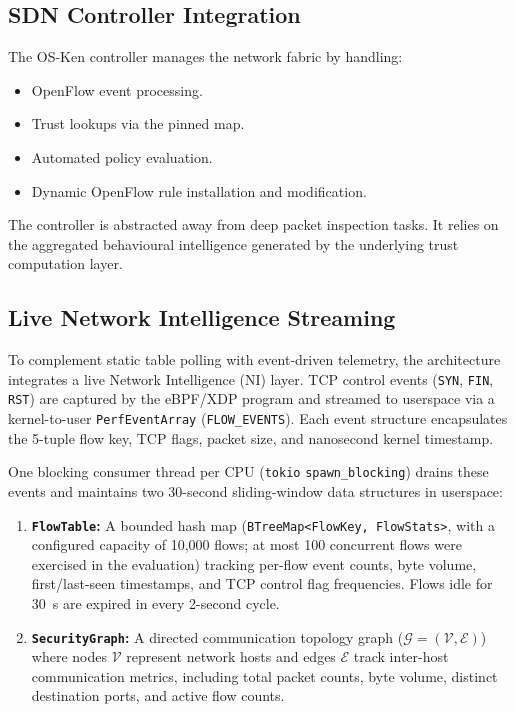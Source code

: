 \documentclass[conference]{IEEEtran}
\begin{document}
\subsection{SDN Controller Integration}
The OS-Ken controller manages the network fabric by handling:
\begin{itemize}
\item OpenFlow event processing.
\item Trust lookups via the pinned map.
\item Automated policy evaluation.
\item Dynamic OpenFlow rule installation and modification.
\end{itemize}
The controller is abstracted away from deep packet inspection tasks. It relies on the aggregated behavioural intelligence generated by the underlying trust computation layer.

\subsection{Live Network Intelligence Streaming}
\label{sec:ni_layer}
To complement static table polling with event-driven telemetry, the architecture integrates a live Network Intelligence (NI) layer. TCP control events (\texttt{SYN}, \texttt{FIN}, \texttt{RST}) are captured by the eBPF/XDP program and streamed to userspace via a kernel-to-user \texttt{PerfEventArray} (\texttt{FLOW\_EVENTS}). Each event structure encapsulates the 5-tuple flow key, TCP flags, packet size, and nanosecond kernel timestamp.

One blocking consumer thread per CPU (\texttt{tokio} \texttt{spawn\_blocking}) drains these events and maintains two 30-second sliding-window data structures in userspace:
\begin{enumerate}
\item \textbf{\texttt{FlowTable}:} A bounded hash map (\texttt{BTreeMap<FlowKey, FlowStats>}, with a configured capacity of 10,000 flows; at most 100 concurrent flows were exercised in the evaluation) tracking per-flow event counts, byte volume, first/last-seen timestamps, and TCP control flag frequencies. Flows idle for 30~s are expired in every 2-second cycle.
\item \textbf{\texttt{SecurityGraph}:} A directed communication topology graph ($\mathcal{G} = (\mathcal{V}, \mathcal{E})$) where nodes $\mathcal{V}$ represent network hosts and edges $\mathcal{E}$ track inter-host communication metrics, including total packet counts, byte volume, distinct destination ports, and active flow counts.
\end{enumerate}
\end{document}
